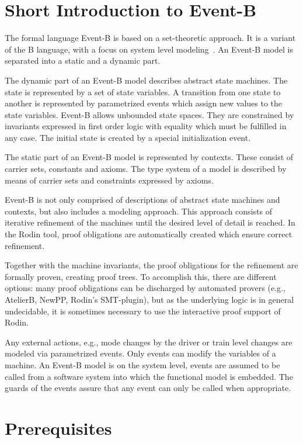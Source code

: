 \documentclass{template/openetcs_article}
\begin{document}
\section{Short Introduction to Event-B}
\label{sec:short-intr-event}

The formal language Event-B is based on a set-theoretic approach. It is a
variant of the B language, with a focus on system level
modeling~\cite{abrial-eventB-Book}. An Event-B model is separated into a static
and a dynamic part.

The dynamic part of an Event-B model describes abstract state machines. The
state is represented by a set of state variables. A transition from one state to
another is represented by parametrized events which assign new values to the
state variables. Event-B allows unbounded state spaces. They are constrained by
invariants expressed in first order logic with equality which must be fulfilled
in any case. The initial state is created by a special initialization event.

The static part of an Event-B model is represented by contexts. These consist of
carrier sets, constants and axioms. The type system of a model is described by
means of carrier sets and constraints expressed by axioms.

Event-B is not only comprised of descriptions of abstract state machines and
contexts, but also includes a modeling approach. This approach consists of
iterative refinement of the machines until the desired level of detail is
reached. In the Rodin tool, proof obligations are automatically created which
ensure correct refinement.

Together with the machine invariants, the proof obligations for the refinement
are formally proven, creating proof trees. To accomplish this, there are
different options: many proof obligations can be discharged by automated provers
(e.g., AtelierB, NewPP, Rodin's SMT-plugin), but as the underlying logic is in
general undecidable, it is sometimes necessary to use the interactive proof
support of Rodin.

Any external actions, e.g., mode changes by the driver or train level changes
are modeled via parametrized events. Only events can modify the variables of a
machine. An Event-B model is on the system level, events are assumed to be
called from a software system into which the functional model is embedded. The
guards of the events assure that any event can only be called when appropriate.

\section{Prerequisites}
\label{sec:prerequisites}
\end{document}
